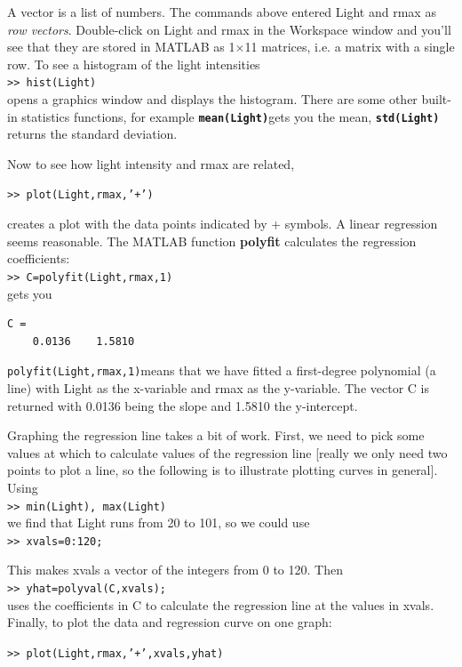 \documentclass [11pt]{article}
\newcommand{\tab}{\hspace*{0.5in}}
\numberwithin{exercise}{section}
\begin{document}
A vector is a list of numbers. The commands above entered Light and rmax as \textit{row vectors}. 
Double-click on Light and rmax in the Workspace window and you'll see that they are 
stored in MATLAB as 1$\times $11 matrices, i.e. a matrix with a single row. 
To see a histogram of the light intensities \\
\tab \texttt{>> hist(Light)} \\
opens a graphics window and displays the histogram. There are some other 
built-in statistics functions, for example \texttt{\textbf{mean(Light)}}gets you 
the mean, \texttt{\textbf{std(Light)}} returns the standard deviation. 

Now to see how light intensity and rmax are related, 

\tab \texttt{>>  plot(Light,rmax,'+')}

creates a plot with the data points indicated by + symbols. A linear 
regression seems reasonable. The MATLAB function \textbf{polyfit} calculates the 
regression coefficients: \\
\tab \texttt{>>  C=polyfit(Light,rmax,1) } \\
gets you 
\begin{verbatim}
C =
    0.0136    1.5810
\end{verbatim}
\texttt{polyfit(Light,rmax,1)}means that we have fitted a first-degree polynomial 
(a line) with Light as the x-variable and rmax as the y-variable. The vector 
C is returned with 0.0136 being the slope and 1.5810 the y-intercept. 

Graphing the regression line takes a bit of work. First, we need to pick 
some values at which to calculate values of the regression line [really we 
only need two points to plot a line, so the following is to illustrate 
plotting curves in general]. Using \\
\tab \texttt{>>  min(Light), max(Light) } \\
we find that Light runs from 20 to 101, so we could use \\
\tab \texttt{>>  xvals=0:120;} 

This makes xvals a vector of the integers from 0 to 120. Then \\
\tab \texttt{>>  yhat=polyval(C,xvals);} \\
uses the coefficients in C to calculate the regression line at the values in 
xvals. Finally, to plot the data and regression curve on one graph: 

\tab \texttt{>> plot(Light,rmax,'+',xvals,yhat)}
\end{document}
